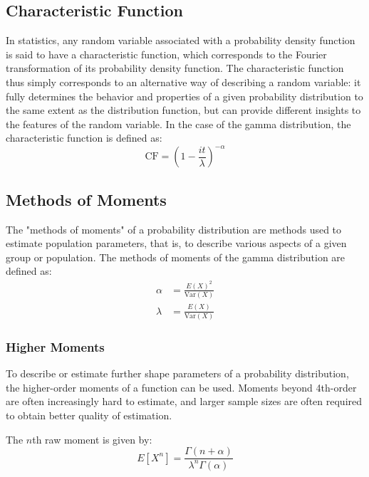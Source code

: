 \documentclass[12pt]{article}
\begin{document}
\subsection{Characteristic Function}\label{subec:advancedproperties:cf}
In statistics, any random variable associated with a probability density function is said to have a characteristic
function, which corresponds to the Fourier transformation of its probability density function. The characteristic
function thus simply corresponds to an alternative way of describing a random variable: it fully determines the behavior
and properties of a given probability distribution to the same extent as the distribution function, but can provide
different insights to the features of the random variable. In the case of the gamma distribution, the characteristic
function is defined as\cite{wikipediaCharacteristicFunctionProbability2022}:
\begin{equation}
	\text{CF} = \left(1-\frac{it}{\lambda}\right)^{-\alpha}
\end{equation}

\subsection{Methods of Moments}
The "methods of moments" of a probability distribution are methods used to estimate population parameters, that is, to
describe various aspects of a given group or population. The methods of moments of the gamma distribution are defined
as\cite{wikipediaMethodMomentsStatistics2021, limWhatPopulationParameter2019}:
\begin{equation}
	\begin{split}
		\alpha	&=	\frac{E(X)^2}{\text{Var}(X)}\\
		\lambda	&=	\frac{E(X)}{\text{Var}(X)}
	\end{split}
\end{equation}

\subsubsection{Higher Moments}
To describe or estimate further shape parameters of a probability distribution, the higher-order moments of a function
can be used. Moments beyond 4th-order are often increasingly hard to estimate, and larger sample sizes are often
required to obtain better quality of estimation\cite{wikipediaMomentMathematics2022}.

The $n$th raw moment is given by:
\begin{equation}
	E[X^n] = \frac{\Gamma(n+\alpha)}{\lambda^n\Gamma(\alpha)}
\end{equation}
\end{document}
